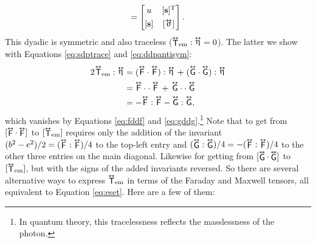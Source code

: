 \documentclass[12pt]{article}
\renewcommand{\vv}[1]{\mathbf{#1}}
\newcommand{\tightoverset}[2]{%
  \mathop{#2}\limits^{\vbox to -.5ex{\kern-0.75ex\hbox{$#1$}\vss}}}
\newcommand{\inlinedy}[1]{\tightoverset{\text{\tiny$\bm\leftrightarrow$}}{#1}}
\newcommand{\capdy}[1]{ \overset{ \text{\tiny$\bm\leftrightarrow$} }{\vphantom{\text{\small{A}}}\smash{#1}} }
\begin{document}
\begin{equation*}
[\capdy{\mathsf{T}}_{\textrm{em}}]
=
\begin{bmatrix}
u & [\vv s]^{\mathrm{T}} \\[1ex]
[\vv s] & [ \, \mkern-2mu \inlinedy{\upsigma} \mkern1mu ]
\end{bmatrix} .
\end{equation*}
This dyadic is symmetric and also traceless (${\inlinedy{\mathsf{T}}} _{\textrm{em}} : \inlinedy{\upeta} = 0$). The latter we show with Equations \ref{eq:sdptrace} and \ref{eq:ddpantisym}:
\begin{equation*}
\begin{split}
2 \mkern1mu \capdy{\mathsf{T}}_{\textrm{em}} : \inlinedy{\upeta} &= ( \capdy{\mathsf{F}} \cdot \capdy{\mathsf{F}}  ) : \inlinedy{\upeta} \, + \; ( \capdy{\mathsf{G}} \cdot \capdy{\mathsf{G}}  ) : \inlinedy{\upeta} \\
&= \capdy{\mathsf{F}} \cdot \cdot \, \mkern1mu \capdy{\mathsf{F}} \, + \, \capdy{\mathsf{G}} \cdot \cdot \, \mkern1mu \capdy{\mathsf{G}} \\
&=  - \capdy{\mathsf{F}} : \capdy{\mathsf{F}} - \capdy{\mathsf{G}} : \capdy{\mathsf{G}} ,
\end{split}
\end{equation*}
which vanishes by Equations \ref{eq:fddf} and \ref{eq:gddg}.\footnote{\label{fn:tlt}In quantum theory, this tracelessness reflects the masslessness of the photon.} Note that to get from $[\inlinedy{\mathsf{F}} \cdot \inlinedy{\mathsf{F}}]$ to $[{\inlinedy{\mathsf{T}}} _{\textrm{em}}]$ requires only the addition of the invariant $(b^2 - e^2) / 2 = ( \inlinedy{\mathsf{F}} : \inlinedy{\mathsf{F}} ) / 4$ to the top-left entry and $( \inlinedy{\mathsf{G}} : \inlinedy{\mathsf{G}} ) / 4 = - ( \inlinedy{\mathsf{F}} : \inlinedy{\mathsf{F}} ) / 4$ to the other three entries on the main diagonal. Likewise for getting from $[ \inlinedy{\mathsf{G}} \cdot \inlinedy{\mathsf{G}} ]$ to $[ {\inlinedy{\mathsf{T}}} _{\textrm{em}} ]$, but with the signs of the added invariants reversed. So there are several alternative ways to express ${\inlinedy{\mathsf{T}}} _{\textrm{em}}$ in terms of the Faraday and Maxwell tensors, all equivalent to Equation \ref{eq:eset}. Here are a few of them:
\end{document}
